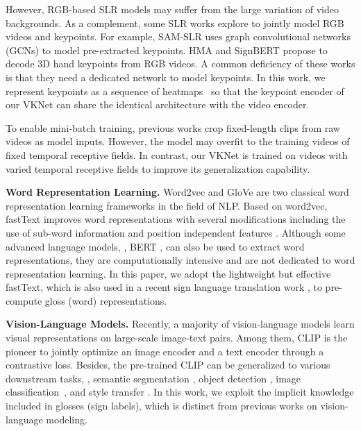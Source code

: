 \documentclass[10pt,twocolumn,letterpaper]{article}
\begin{document}
However, RGB-based SLR models may suffer from the large variation of video backgrounds. 
As a complement, some SLR works \cite{jiang2021skeleton, jiang2021sign, hu2021hand, hu2021signbert, chentwo} explore to jointly model RGB videos and keypoints.
For example, SAM-SLR \cite{jiang2021skeleton} uses graph convolutional networks (GCNs) to model pre-extracted keypoints.
HMA \cite{hu2021hand} and SignBERT \cite{hu2021signbert} propose to decode 3D hand keypoints from RGB videos.
A common deficiency of these works is that they need a dedicated network to model keypoints.
In this work, we represent keypoints as a sequence of heatmaps~\cite{duan2022revisiting, chentwo} so that the keypoint encoder of our VKNet can share the identical architecture with the video encoder.

To enable mini-batch training, previous works \cite{jiang2021sign, jiang2021skeleton, hu2021signbert, hu2021hand, li2020transferring, li2020word} crop fixed-length clips from raw videos as model inputs.
However, the model may overfit to the training videos of fixed temporal receptive fields.
In contrast, our VKNet is trained on videos with varied temporal receptive fields to improve its generalization capability.



\noindent\textbf{Word Representation Learning.}
Word2vec \cite{word2vec} and GloVe \cite{glove} are two classical word representation learning frameworks in the field of NLP.
Based on word2vec, fastText \cite{mikolov2018advances} improves word representations with several modifications including the use of sub-word information \cite{bojanowski2017enriching} and position independent features \cite{mnih2013learning}.
Although some advanced language models, \eg, BERT \cite{kenton2019bert}, can also be used to extract word representations, they are computationally intensive and are not dedicated to word representation learning.
In this paper, we adopt the lightweight but effective fastText, which is also used in a recent sign language translation work \cite{yin2021simulslt}, to pre-compute gloss (word) representations.


\noindent\textbf{Vision-Language Models.}
Recently, a majority of vision-language models \cite{clip, align, yao2022filip, gu2022wukong} learn visual representations on large-scale image-text pairs.
Among them, CLIP \cite{clip} is the pioneer to jointly optimize an image encoder and a text encoder through a contrastive loss. 
Besides, the pre-trained CLIP can be generalized to various downstream tasks, \eg, semantic segmentation \cite{xu2022groupvit, li2021language, xu2021simple}, object detection \cite{du2022learning, rao2022denseclip}, image classification~\cite{zhou2022learning,huang2022unsupervised}, and style transfer \cite{patashnik2021styleclip, kwon2022clipstyler}.
In this work, we exploit the implicit knowledge included in glosses (sign labels), which is distinct from previous works on vision-language modeling.
\end{document}
